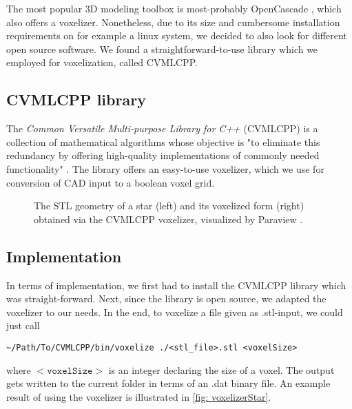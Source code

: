 The most popular 3D modeling toolbox is most-probably OpenCascade \cite{OpenCascade}, which also offers a voxelizer. Nonetheless, due to its size and cumbersome installation requirements on for example a linux system, we decided to also look for different open source software. We found a straightforward-to-use library which we employed for voxelization, called CVMLCPP.

\subsection{CVMLCPP library}
The \emph{Common Versatile Multi-purpose Library for C++} (CVMLCPP) is a collection of mathematical algorithms whose objective is "to eliminate this redundancy by offering high-quality implementations of commonly needed functionality" \cite{CVMLCPP}. The library offers an easy-to-use voxelizer, which we use for conversion of CAD input to a boolean voxel grid.

\begin{figure}
\centering
\begin{subfigure}{
  \texttt{[image: Pictures/STLToVoxels/Star\_STL.png]}}
\end{subfigure}
\begin{subfigure}{
  \texttt{[image: Pictures/STLToVoxels/Star\_VTK\_Trans.png]}}
\end{subfigure}
\caption{The STL geometry of a star (left) and its voxelized form (right) obtained via the CVMLCPP voxelizer, visualized by Paraview \cite{Paraview}.}
\label{fig: voxelizerStar}
\end{figure}

\subsection{Implementation}
In terms of implementation, we first had to install the CVMLCPP library which was straight-forward. Next, since the library is open source, we adapted the voxelizer to our needs. In the end, to voxelize a file given as .stl-input, we could just call 
\begin{lstlisting}
~/Path/To/CVMLCPP/bin/voxelize ./<stl_file>.stl <voxelSize>
\end{lstlisting}
where $\mathtt{<voxelSize>}$ is an integer declaring the size of a voxel. The output gets written to the current folder in terms of an .dat binary file. An example result of using the voxelizer is illustrated in \autoref{fig: voxelizerStar}.